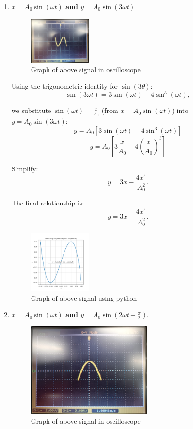 \begin{enumerate}
\newpage
\item \textbf{\large \textbf{$x = A_0 \sin(\omega t)$} and \textbf{$y = A_0 \sin(3\omega t)$}}\\
 \begin{figure}[h!]
    \centering
    \includegraphics[width=0.3\textwidth]{actualgraph/3sin.jpeg}
    \caption{Graph of above signal in oscilloscope}
    \label{fig:sample_image}
    \end{figure}
Using the trigonometric identity for \(\sin(3\theta)\):
\[
\sin(3\omega t) = 3\sin(\omega t) - 4\sin^3(\omega t),
\]

we substitute \(\sin(\omega t) = \frac{x}{A_0}\) (from \(x = A_0 \sin(\omega t)\)) into \(y = A_0 \sin(3\omega t)\):
\[
y = A_0 \left[3\sin(\omega t) - 4\sin^3(\omega t)\right]
\]
\[
y = A_0 \left[3\frac{x}{A_0} - 4\left(\frac{x}{A_0}\right)^3\right]
\]

Simplify:
\[
y = 3x - \frac{4x^3}{A_0^2}.
\]

The final relationship is:
\[
y = 3x - \frac{4x^3}{A_0^2}.
\]
 \begin{figure}[h!]
    \centering
    \includegraphics[width=0.3\textwidth]{graphs/Figure_4.png}
    \caption{Graph of above signal using python}
    \label{fig:sample_image}
     \end{figure}

\item \textbf{\large \textbf{$x = A_0 \sin(\omega t)$} and \textbf{$y = A_0 \sin(2\omega t+\frac{\pi}{2})$}},\\
\begin{figure}[h!]
    \centering
    \includegraphics[width=0.6\textwidth]{actualgraph/parab.jpeg}
    \caption{Graph of above signal in oscilloscope}
    \label{fig:sample_image}
     \end{figure}


\end{enumerate}
